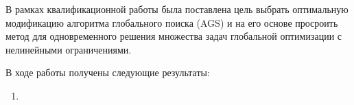 
В рамках квалификационной работы была поставлена цель выбрать оптимальную модификацию алгоритма глобального поиска (AGS)
и на его основе просроить метод для одновременного решения множества задач глобальной оптимизации с нелинейными ограничениями.

В ходе работы получены следующие результаты:
\begin{enumerate}
    \item 
\end{enumerate}
